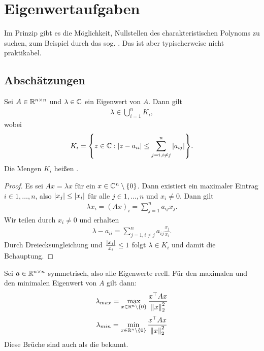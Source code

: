 \documentclass{report}
\begin{document}
	\chapter{Eigenwertaufgaben}
	Im Prinzip gibt es die Möglichkeit, Nullstellen des charakteristischen Polynoms zu suchen, zum Beispiel durch das sog. . Das ist aber typischerweise nicht praktikabel.
	\section{Abschätzungen}
	\begin{theorem}
		Sei $A \in \mathbb{R}^{n \times n}$ und $\lambda \in \mathbb{C}$ ein Eigenwert von $A$. Dann gilt
		\begin{align*}
			\lambda \in \bigcup_{i = 1}^n K_i,
		\end{align*}
		wobei
		\begin{align*}
			K_i = \qty{z \in \mathbb{C}: \abs{z - a_{ii}} \leq \sum_{j = i, i \neq j}^n \abs{a_{ij}}}.
		\end{align*}
		Die Mengen $K_i$ heißen .
	\end{theorem}
	\begin{proof}
		Es sei $Ax = \lambda x$ für ein $x \in \mathbb{C}^n \setminus \qty{0}$. Dann existiert ein maximaler Eintrag $i \in 1, \hdots, n$, also $\abs{x_j} \leq \abs{x_i}$ für alle $j \in 1, \hdots,n$ und $x_i \neq 0$. Dann gilt
		\begin{align*}
			\lambda x_i = (Ax)_i = \sum_{j = 1}^n a_{ij}x_j.
		\end{align*}
		Wir teilen durch $x_i \neq 0$ und erhalten
		\begin{align*}
			\lambda - a_{ii} = \sum_{j = 1, i \neq j}^n a_{ij} \frac{x_j}{x_i}.
		\end{align*}
		Durch Dreiecksungleichung und $\frac{\abs{x_j}}{x_i} \leq 1$ folgt $\lambda \in K_i$ und damit die Behauptung.
	\end{proof}
	\begin{theorem}
		Sei $a \in \mathbb{R}^{n \times n}$ symmetrisch, also alle Eigenwerte reell. Für den maximalen und den minimalen Eigenwert von $A$ gilt dann:
		\begin{align*}
			\lambda_{max} = \max_{x \in \mathbb{R}^n \setminus \qty{0}} \frac{x^\top A x}{\norm{x}^2_2}
		\end{align*}
		\begin{align*}
			\lambda_{min} = \min_{x \in \mathbb{R}^n \setminus \qty{0}} \frac{x^\top A x}{\norm{x}^2_2}
		\end{align*}
		Diese Brüche sind auch als die  bekannt.
	\end{theorem}
\end{document}
